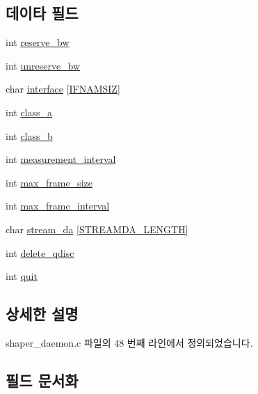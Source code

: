 \subsection*{데이타 필드}
\begin{DoxyCompactItemize}
\item 
int \hyperlink{structcmd__ip_a097e8a948d42cb86e10e0c667e2226bf}{reserve\+\_\+bw}
\item 
int \hyperlink{structcmd__ip_a7f0818a9cd62d9342ed94c8165764abe}{unreserve\+\_\+bw}
\item 
char \hyperlink{structcmd__ip_adef660e3c86e05938c7534436677f6ee}{interface} \mbox{[}\hyperlink{tl_2openavb__tl__pub_8h_acd06da230a96d3b7e6f193c5b3142002}{I\+F\+N\+A\+M\+S\+IZ}\mbox{]}
\item 
int \hyperlink{structcmd__ip_a6dbf62a77a5eba89b03f961c1674a8e2}{class\+\_\+a}
\item 
int \hyperlink{structcmd__ip_a2f8fc8fa9d90656bc7012b2da063c4f5}{class\+\_\+b}
\item 
int \hyperlink{structcmd__ip_a848591ef9ab34f6f2eb816fe385fa4d4}{measurement\+\_\+interval}
\item 
int \hyperlink{structcmd__ip_a09c29b0090a82147afdb50ae0013b9c6}{max\+\_\+frame\+\_\+size}
\item 
int \hyperlink{structcmd__ip_a0aab5ed8ce61499c1535ea86d3090930}{max\+\_\+frame\+\_\+interval}
\item 
char \hyperlink{structcmd__ip_a2a697cef6f075b15af7e7976a9bdd095}{stream\+\_\+da} \mbox{[}\hyperlink{openavb__endpoint__osal__shaper_8c_a4d02202f6eb4ba09b3da91b3573043dc}{S\+T\+R\+E\+A\+M\+D\+A\+\_\+\+L\+E\+N\+G\+TH}\mbox{]}
\item 
int \hyperlink{structcmd__ip_ac8c5880d70b2a0f4ada79a3d4fedf962}{delete\+\_\+qdisc}
\item 
int \hyperlink{structcmd__ip_a2896431d6a80cd39b3d24b40237612ee}{quit}
\end{DoxyCompactItemize}


\subsection{상세한 설명}


shaper\+\_\+daemon.\+c 파일의 48 번째 라인에서 정의되었습니다.



\subsection{필드 문서화}
